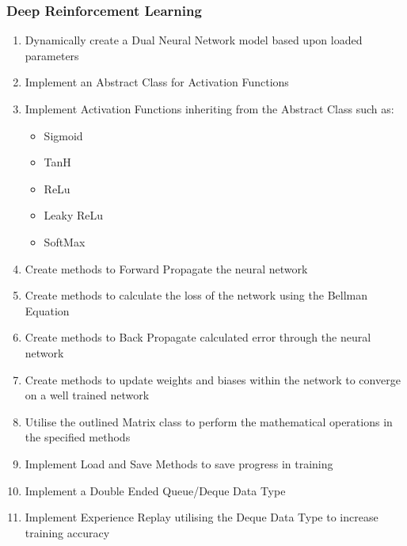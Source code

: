 \begin{flushleft}
            \subsubsection*{Deep Reinforcement Learning}
                \begin{enumerate}
                    \item Dynamically create a Dual Neural Network model based upon loaded parameters
                    \item Implement an Abstract Class for Activation Functions
                    \item Implement Activation Functions inheriting from the Abstract Class such as:
                    \begin{itemize}
                        \item Sigmoid
                        \item TanH
                        \item ReLu
                        \item Leaky ReLu
                        \item SoftMax
                    \end{itemize}
                    \item Create methods to Forward Propagate the neural network
                    \item Create methods to calculate the loss of the network using the Bellman Equation
                    \item Create methods to Back Propagate calculated error through the neural network
                    \item Create methods to update weights and biases within the network to converge on a well trained network
                    \item Utilise the outlined Matrix class to perform the mathematical operations in the specified methods
                    \item Implement Load and Save Methods to save progress in training
                    \item Implement a Double Ended Queue/Deque Data Type
                    \item Implement Experience Replay utilising the Deque Data Type to increase training accuracy
                \end{enumerate}   

\end{flushleft}
